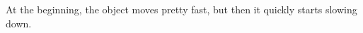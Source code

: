 \documentclass[]{standalone}
\begin{document}
\begin{minipage}{30ex}
    At the beginning, the object moves pretty fast, but then it quickly starts
    slowing down.
\end{minipage}
\end{document}

